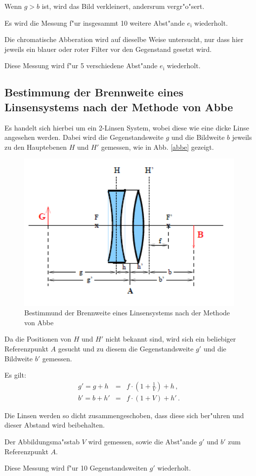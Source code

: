 		Wenn $g > b$ ist, wird das Bild verkleinert, andersrum vergr"o"sert.

		Es wird die Messung f"ur insgesammt 10 weitere Abst"ande $e_\mathrm{i}$ wiederholt.

		Die chromatische Abberation wird auf dieselbe Weise untersucht, nur dass hier jeweils ein blauer oder roter Filter vor den Gegenstand gesetzt wird.

		Diese Messung wird f"ur 5 verschiedene Abst"ande $e_\mathrm{i}$ wiederholt.

	\subsection{Bestimmung der Brennweite eines Linsensystems nach der Methode von Abbe} %
		\label{sub:bestimmung_der_brennweite_eines_linsensystems_nach_der_methode_von_abbe}

		Es handelt sich hierbei um ein 2-Linsen System, wobei diese wie eine dicke Linse angesehen werden.
		Dabei wird die Gegenstandsweite $g$ und die Bildweite $b$ jeweils zu den Hauptebenen $H$ und $H'$ gemessen, wie in Abb. \eqref{abbe} gezeigt.

		\begin{figure}[htbp]
			\centering
			\includegraphics[width = 12cm]{img/abbe.PNG}
			\caption{Bestimmund der Brennweite eines Linsensystems nach der Methode von Abbe}
			\label{abbe}
		\end{figure}

		Da die Positionen von $H$ und $H'$ nicht bekannt sind, wird sich ein beliebiger Referenzpunkt $A$ gesucht und zu diesem die Gegenstandsweite $g'$ und die Bildweite $b'$ gemessen.

		Es gilt:
		\begin{eqnarray*}
			g' = g+h &=& f \cdot \left( 1 + \frac{1}{V} \right) + h \, ,\\
			b' = b+h' &=& f \cdot (1 + V) + h' \, .
		\end{eqnarray*}

		Die Linsen werden so dicht zusammengeschoben, dass diese sich ber"uhren und dieser Abstand wird beibehalten.

		Der Abbildungsma"sstab $V$ wird gemessen, sowie die Abst"ande $g'$ und $b'$ zum Referenzpunkt $A$.

		Diese Messung wird f"ur 10 Gegenstandsweiten $g'$ wiederholt.